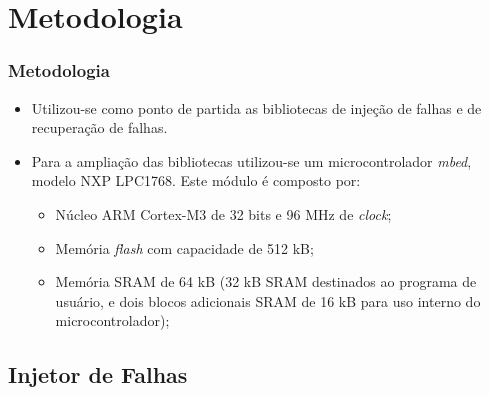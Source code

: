 
\section{Metodologia} \label{Sec:Metodologia}

\begin{frame}
	\frametitle{Metodologia}
	\begin{itemize}	
		\item Utilizou-se como ponto de partida as bibliotecas de injeção de falhas e de recuperação de falhas. 
		\item Para a ampliação das bibliotecas utilizou-se um microcontrolador \textit{mbed}, modelo NXP LPC1768. Este módulo é composto por:
		\begin{itemize}
			\item Núcleo ARM Cortex-M3 de 32 bits e 96 MHz de \textit{clock};
			\item Memória \textit{flash} com capacidade de 512 kB;
			\item Memória SRAM de 64 kB (32 kB SRAM destinados ao programa de usuário, e dois blocos adicionais SRAM de 16 kB para uso interno do microcontrolador);		
		\end{itemize}
	\end{itemize}
\end{frame}

\subsection{Injetor de Falhas}

